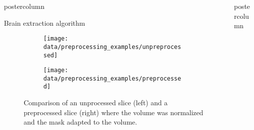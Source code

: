 \begin{frame}
\begin{columns}
\begin{column}{.42\textwidth}
\begin{beamercolorbox}[center]{postercolumn}
\begin{minipage}{.98\textwidth}
{\begin{myblock}{Brain extraction algorithm}
                                \begin{figure}
                                    \centering
                                    \begin{subfigure}{0.4\textwidth}
                                        \centering
                                        \texttt{[image: data/preprocessing\_examples/unpreprocessed]}
                                    \end{subfigure}
                                    \begin{subfigure}{0.4\textwidth}
                                        \centering
                                        \texttt{[image: data/preprocessing\_examples/preprocessed]}
                                    \end{subfigure}
                                    \caption{Comparison of an unprocessed slice (left) and a preprocessed slice (right) where the volume was normalized and the mask adapted to the volume.}
                                \end{figure}
                            \end{myblock}\vfill





                        }

                    \end{minipage}
                \end{beamercolorbox}
            \end{column}
            \begin{column}{.59\textwidth}
                \begin{beamercolorbox}[center]{postercolumn}
                    \begin{minipage}{.98\textwidth} %
                        \parbox[t][\columnheight]{\textwidth}{ %


}
\end{minipage}
\end{beamercolorbox}
\end{column}
\end{columns}
\end{frame}

